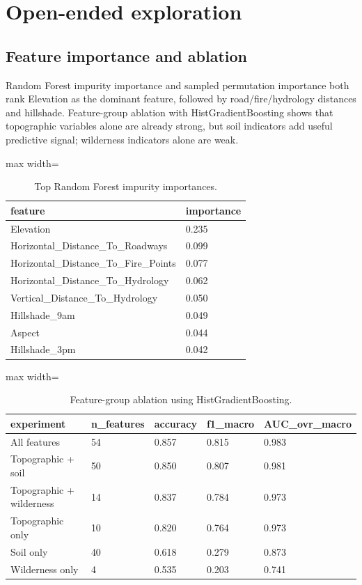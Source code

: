 \documentclass{article}
\begin{document}
\section{Open-ended exploration}
\subsection{Feature importance and ablation}
Random Forest impurity importance and sampled permutation importance both rank Elevation as the dominant feature, followed by road/fire/hydrology distances and hillshade. Feature-group ablation with HistGradientBoosting shows that topographic variables alone are already strong, but soil indicators add useful predictive signal; wilderness indicators alone are weak.

\begin{table}[H]
\centering
\caption{Top Random Forest impurity importances.}
\label{tab:feature_importance}
\small
\begin{adjustbox}{max width=\linewidth}
\begin{tabular}{ll}
\toprule
feature & importance \\
\midrule
Elevation & 0.235 \\
Horizontal\_Distance\_To\_Roadways & 0.099 \\
Horizontal\_Distance\_To\_Fire\_Points & 0.077 \\
Horizontal\_Distance\_To\_Hydrology & 0.062 \\
Vertical\_Distance\_To\_Hydrology & 0.050 \\
Hillshade\_9am & 0.049 \\
Aspect & 0.044 \\
Hillshade\_3pm & 0.042 \\
\bottomrule
\end{tabular}
\end{adjustbox}
\end{table}

\begin{table}[H]
\centering
\caption{Feature-group ablation using HistGradientBoosting.}
\label{tab:ablation}
\small
\begin{adjustbox}{max width=\linewidth}
\begin{tabular}{lllll}
\toprule
experiment & n\_features & accuracy & f1\_macro & AUC\_ovr\_macro \\
\midrule
All features & 54 & 0.857 & 0.815 & 0.983 \\
Topographic + soil & 50 & 0.850 & 0.807 & 0.981 \\
Topographic + wilderness & 14 & 0.837 & 0.784 & 0.973 \\
Topographic only & 10 & 0.820 & 0.764 & 0.973 \\
Soil only & 40 & 0.618 & 0.279 & 0.873 \\
Wilderness only & 4 & 0.535 & 0.203 & 0.741 \\
\bottomrule
\end{tabular}
\end{adjustbox}
\end{table}
\end{document}
